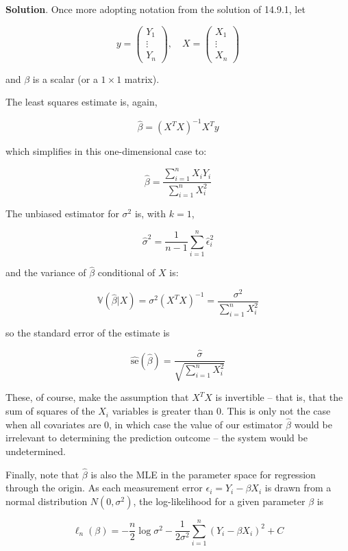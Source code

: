 \textbf{Solution}. Once more adopting notation from the solution of
14.9.1, let

\[ y = \begin{pmatrix} Y_{1} \\ \vdots \\ Y_{n} \end{pmatrix},
\quad
X = \begin{pmatrix} X_{1} \\ \vdots \\ X_{n} \end{pmatrix}\]

and \(\beta\) is a scalar (or a \(1 \times 1\) matrix).

The least squares estimate is, again,

\[\hat{\beta} = (X^T X)^{-1} X^T y\]

which simplifies in this one-dimensional case to:

\[\hat{\beta} = \frac{\sum_{i=1}^{n} X_{i} Y_{i}}{\sum_{i=1}^{n} X_{i}^{2}}\]

The unbiased estimator for \(\sigma^{2}\) is, with \(k = 1\),

\[\hat{\sigma}^{2} = \frac{1}{n - 1} \sum_{i=1}^{n} \hat{\epsilon}_{i}^{2}\]

and the variance of \(\hat{\beta}\) conditional of \(X\) is:

\[\mathbb{V}(\hat{\beta} | X) = \sigma^{2} (X^T X)^{-1} = \frac{\sigma^{2}}{\sum_{i=1}^{n} X_{i}^{2}}\]

so the standard error of the estimate is

\[\hat{\text{se}}(\hat{\beta}) = \frac{\hat{\sigma}}{\sqrt{\sum_{i=1}^{n} X_{i}^{2}}}\]

These, of course, make the assumption that \(X^T X\) is invertible --
that is, that the sum of squares of the \(X_{i}\) variables is greater
than 0. This is only not the case when all covariates are 0, in which
case the value of our estimator \(\hat{\beta}\) would be irrelevant to
determining the prediction outcome -- the system would be undetermined.

Finally, note that \(\hat{\beta}\) is also the MLE in the parameter
space for regression through the origin. As each measurement error
\(\epsilon_{i} = Y_{i} - \beta X_{i}\) is drawn from a normal distribution
\(N(0, \sigma^{2})\), the log-likelihood for a given parameter \(\beta\)
is

\[\ell_{n}(\beta) = -\frac{n}{2} \log \sigma^{2} - \frac{1}{2 \sigma^{2}} \sum_{i=1}^{n} (Y_{i} - \beta X_{i})^{2} + C\]

